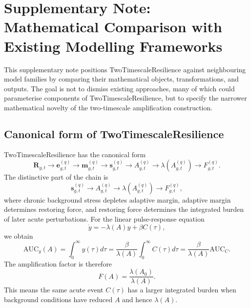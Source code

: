 	\clearpage
	\appendix
	\section{Supplementary Note: Mathematical Comparison with Existing Modelling Frameworks}
	\label{supp:comparison}
	
	This supplementary note positions TwoTimescaleResilience against neighbouring model families by comparing their mathematical objects, transformations, and outputs. The goal is not to dismiss existing approaches, many of which could parameterise components of TwoTimescaleResilience, but to specify the narrower mathematical novelty of the two-timescale amplification construction.
	
	\subsection{Canonical form of TwoTimescaleResilience}
	
	TwoTimescaleResilience has the canonical form
	\begin{equation}
		\mathbf{R}_{g,t}
		\rightarrow \mathbf{e}^{(q)}_{g,t}
		\rightarrow \mathbf{m}^{(q)}_{g,t}
		\rightarrow \mathbf{s}^{(q)}_{g,t}
		\rightarrow A^{(q)}_{g,t}
		\rightarrow \lambda(A^{(q)}_{g,t})
		\rightarrow F^{(q)}_{g,t}.
	\end{equation}
	The distinctive part of the chain is
	\begin{equation}
		\mathbf{s}^{(q)}_{g,t}
		\rightarrow A^{(q)}_{g,t}
		\rightarrow \lambda(A^{(q)}_{g,t})
		\rightarrow F^{(q)}_{g,t},
	\end{equation}
	where chronic background stress depletes adaptive margin, adaptive margin determines restoring force, and restoring force determines the integrated burden of later acute perturbations. For the linear pulse-response equation
	\begin{equation}
		\dot{y}=-\lambda(A)y+\beta C(\tau),
	\end{equation}
	we obtain
	\begin{equation}
		\mathrm{AUC}_y(A)=\int_0^\infty y(\tau)d\tau
		=\frac{\beta}{\lambda(A)}\int_0^\infty C(\tau)d\tau
		=\frac{\beta}{\lambda(A)}\mathrm{AUC}_C.
	\end{equation}
	The amplification factor is therefore
	\begin{equation}
		F(A)=\frac{\lambda(A_0)}{\lambda(A)}.
	\end{equation}
	This means the same acute event $C(\tau)$ has a larger integrated burden when background conditions have reduced $A$ and hence $\lambda(A)$.
	
